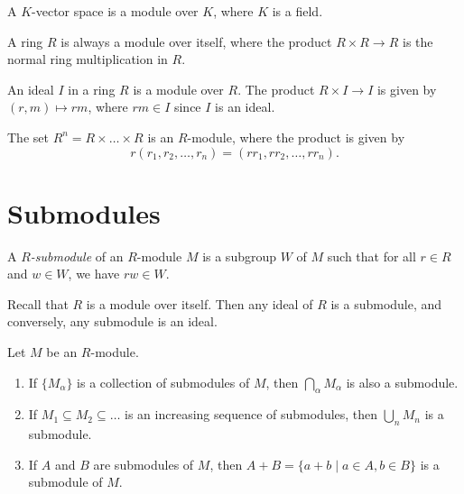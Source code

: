\begin{example}
  A $K$-vector space is a module over $K$, where $K$
  is a field.
\end{example}

\begin{example}
  A ring $R$ is always a module over itself, where
  the product $R \times R \to R$ is the normal ring
  multiplication in $R$.
\end{example}

\begin{example}
  An ideal $I$ in a ring $R$ is a module over $R$.
  The product $R \times I \to I$ is given by
  $(r, m) \mapsto rm$, where $rm \in I$ since $I$ is
  an ideal.
\end{example}

\begin{example}
  The set $R^n = R \times \dots \times R$ is an
  $R$-module, where the product is given by
  \[
    r(r_1, r_2, \dots, r_n) =
    (rr_1, rr_2, \dots, rr_n).
  \]
\end{example}

\section{Submodules}
\begin{definition}
  A \emph{$R$-submodule} of an $R$-module $M$ is a
  subgroup $W$ of $M$ such that for all $r \in R$ and
  $w \in W$, we have $rw \in W$.
\end{definition}

\begin{example}
  Recall that $R$ is a module over itself. Then any
  ideal of $R$ is a submodule, and conversely, any
  submodule is an ideal.
\end{example}

\begin{prop}
  Let $M$ be an $R$-module.
  \begin{enumerate}
    \item If $\{M_\alpha\}$ is a collection of submodules
      of $M$, then $\bigcap_\alpha M_\alpha$ is also
      a submodule.
    \item If $M_1 \subseteq M_2 \subseteq \dots$ is an
      increasing sequence of submodules, then
      $\bigcup_n M_n$ is a submodule.
    \item If $A$ and $B$ are submodules of $M$, then
      $A + B = \{a + b \mid a \in A, b \in B\}$ is a
      submodule of $M$.
  \end{enumerate}
\end{prop}

